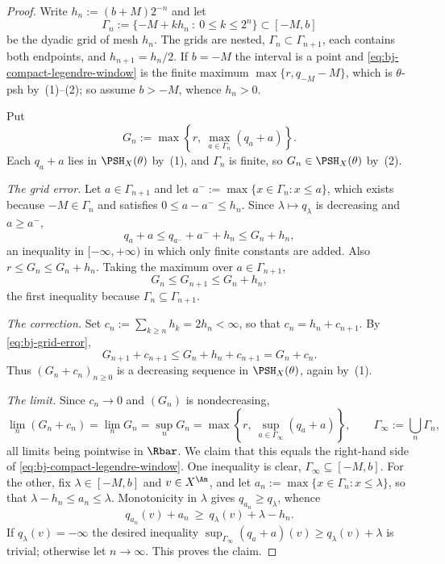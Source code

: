 \begin{proof}
Write $h_n:=(b+M)2^{-n}$ and let
\[
 \Gamma_n:=\{-M+kh_n\ :\ 0\le k\le2^n\}\subset[-M,b]
\]
be the dyadic grid of mesh $h_n$.  The grids are nested,
$\Gamma_n\subset\Gamma_{n+1}$, each contains both endpoints, and
$h_{n+1}=h_n/2$.  If $b=-M$ the interval is a point and
\eqref{eq:bj-compact-legendre-window} is the finite maximum
$\max\{r,q_{-M}-M\}$, which is $\theta$-psh by
\,(1)--(2); so assume $b>-M$, whence
$h_n>0$.

Put
\[
 G_n:=\max\left\{r,\ \max_{a\in\Gamma_n}(q_a+a)\right\}.
\]
Each $q_a+a$ lies in $\PSH_X(\theta)$ by
\,(1), and $\Gamma_n$ is finite, so
$G_n\in\PSH_X(\theta)$ by
\,(2).

\emph{The grid error.}  Let $a\in\Gamma_{n+1}$ and let
$a^-:=\max\{x\in\Gamma_n:x\le a\}$, which exists because
$-M\in\Gamma_n$ and satisfies $0\le a-a^-\le h_n$.  Since
$\lambda\mapsto q_\lambda$ is decreasing and $a\ge a^-$,
\[
                 q_a+a\le q_{a^-}+a^-+h_n\le G_n+h_n,
\]
an inequality in $[-\infty,+\infty)$ in which only finite constants are
added.  Also $r\le G_n\le G_n+h_n$.  Taking the maximum over
$a\in\Gamma_{n+1}$,
\[
                         G_n\le G_{n+1}\le G_n+h_n,
\tag{39.37}\label{eq:bj-grid-error}
\]
the first inequality because $\Gamma_n\subseteq\Gamma_{n+1}$.

\emph{The correction.}  Set $c_n:=\sum_{k\ge n}h_k=2h_n<\infty$, so that
$c_n=h_n+c_{n+1}$.  By \eqref{eq:bj-grid-error},
\[
                         G_{n+1}+c_{n+1}\le G_n+h_n+c_{n+1}=G_n+c_n .
\]
Thus $(G_n+c_n)_{n\ge0}$ is a decreasing sequence in $\PSH_X(\theta)$,
again by \,(1).

\emph{The limit.}  Since $c_n\to0$ and $(G_n)$ is nondecreasing,
\[
 \lim_n(G_n+c_n)=\lim_nG_n=\sup_nG_n
 =\max\left\{r,\ \sup_{a\in\Gamma_\infty}(q_a+a)\right\},
 \qquad
 \Gamma_\infty:=\bigcup_n\Gamma_n,
\]
all limits being pointwise in $\Rbar$.  We claim that this equals the
right-hand side of \eqref{eq:bj-compact-legendre-window}.  One inequality is
clear, $\Gamma_\infty\subseteq[-M,b]$.  For the other, fix
$\lambda\in[-M,b]$ and $v\in X^{\An}$, and let
$a_n:=\max\{x\in\Gamma_n:x\le\lambda\}$, so that
$\lambda-h_n\le a_n\le\lambda$.  Monotonicity in $\lambda$ gives
$q_{a_n}\ge q_\lambda$, whence
\[
 q_{a_n}(v)+a_n\ \ge\ q_\lambda(v)+\lambda-h_n .
\]
If $q_\lambda(v)=-\infty$ the desired inequality
$\sup_{\Gamma_\infty}(q_a+a)(v)\ge q_\lambda(v)+\lambda$ is trivial;
otherwise let $n\to\infty$.  This proves the claim.


\end{proof}
